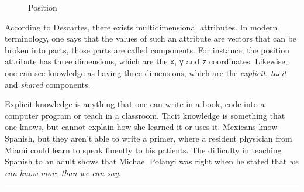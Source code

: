 \documentclass[
  12pt,
]{book}
\begin{document}
\begin{figure}
\caption{Position}
\label{fig:position-coordinates}
\end{figure}

According to Descartes, there exists multidimensional attributes. In
modern terminology, one says that the values of such an attribute are
vectors that can be broken into parts, those parts are called
components. For instance, the position attribute has three dimensions,
which are the \texttt{x}, \texttt{y} and \texttt{z} coordinates.
Likewise, one can see knowledge as having three dimensions, which are
the \emph{explicit}, \emph{tacit} and \emph{shared} components.

Explicit knowledge is anything that one can write in a book, code into a
computer program or teach in a classroom. Tacit knowledge is something
that one knows, but cannot explain how she learned it or uses it.
Mexicans know Spanish, but they aren't able to write a primer, where a
resident physician from Miami could learn to speak fluently to his
patients. The difficulty in teaching Spanish to an adult shows that
Michael Polanyi was right when he stated that \emph{we can know more
than we can say}.

\begin{center}\rule{0.5\linewidth}{0.5pt}\end{center}

\end{document}
